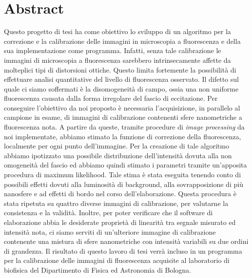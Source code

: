 \clearpage{\pagestyle{empty}\cleardoublepage}

\chapter*{Abstract}


Questo progetto di tesi ha come obiettivo lo sviluppo di un algoritmo per la correzione e la calibrazione delle immagini in microscopia a fluorescenza e della sua implementazione come programma.
Infatti, senza tale calibrazione le immagini di microscopia a fluorescenza sarebbero intrinsecamente affette da molteplici tipi di distorsioni ottiche.
Questo limita fortemente la possibilità di effettuare analisi quantitative del livello di fluorescenza osservato.
Il difetto sul quale ci siamo soffermati è la disomogeneità di campo, ossia una non uniforme fluorescenza causata dalla forma irregolare del fascio di eccitazione.
Per conseguire l'obiettivo da noi proposto è necessaria l'acquisizione, in parallelo al campione in esame, di immagini di calibrazione contenenti sfere nanometriche a fluorescenza nota.
A partire da queste, tramite procedure di \textit{image processing} da noi implementate, abbiamo stimato la funzione di correzione della fluorescenza, localmente per ogni punto dell'immagine.
Per la creazione di tale algoritmo abbiamo ipotizzato una possibile distribuzione dell'intensità dovuta alla non omogeneità del fascio ed abbiamo quindi stimato i parametri tramite un'apposita procedura di maximum likelihood.
Tale stima è stata eseguita tenendo conto di possibili effetti dovuti alla luminosità di background, alla sovrapposizione di più nanosfere e ad effetti di bordo nel corso dell'elaborazione.
Questa procedura è stata ripetuta su quattro diverse immagini di calibrazione, per valutarne la consistenza e la validità.
Inoltre, per poter verificare che il software di elaborazione abbia le desiderate proprietà di linearità tra segnale misurato ed intensità nota, ci siamo serviti di un'ulteriore immagine di calibrazione contenente una mistura di sfere nanometriche con intensità variabili su due ordini di grandezza.
Il risultato di questo lavoro di tesi verrà incluso in un programma per la calibrazione delle immagini di fluorescenza acquisite al laboratorio di biofisica del Dipartimento di Fisica ed Astronomia di Bologna.
